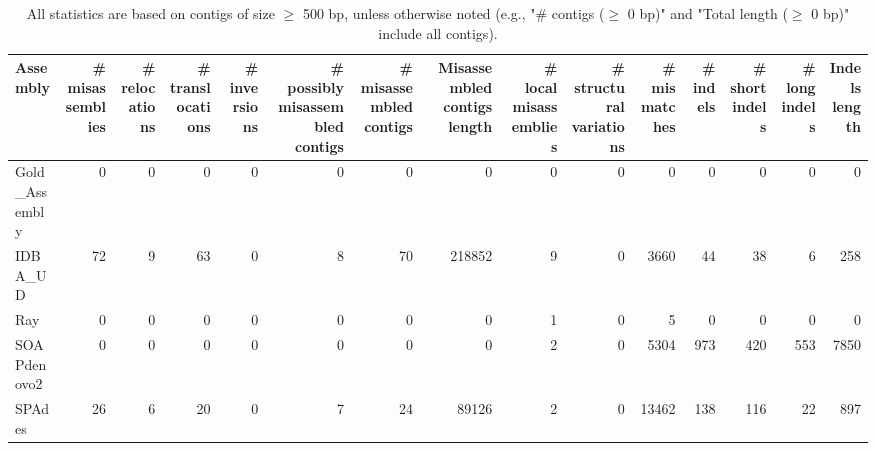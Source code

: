 \documentclass[12pt,a4paper]{article}
\begin{document}
\begin{table}[ht]
\begin{center}
\caption{All statistics are based on contigs of size $\geq$ 500 bp, unless otherwise noted (e.g., "\# contigs ($\geq$ 0 bp)" and "Total length ($\geq$ 0 bp)" include all contigs).}
\begin{tabular}{|l*{14}{|r}|}
\hline
Assembly & \# misassemblies &     \# relocations &     \# translocations &     \# inversions & \# possibly misassembled contigs & \# misassembled contigs & Misassembled contigs length & \# local misassemblies & \# structural variations & \# mismatches & \# indels &     \# short indels &     \# long indels & Indels length \\ \hline
Gold\_Assembly & 0 & 0 & 0 & 0 & 0 & 0 & 0 & 0 & 0 & 0 & 0 & 0 & 0 & 0 \\ \hline
IDBA\_UD & 72 & 9 & 63 & 0 & 8 & 70 & 218852 & 9 & 0 & 3660 & 44 & 38 & 6 & 258 \\ \hline
Ray & 0 & 0 & 0 & 0 & 0 & 0 & 0 & 1 & 0 & 5 & 0 & 0 & 0 & 0 \\ \hline
SOAPdenovo2 & 0 & 0 & 0 & 0 & 0 & 0 & 0 & 2 & 0 & 5304 & 973 & 420 & 553 & 7850 \\ \hline
SPAdes & 26 & 6 & 20 & 0 & 7 & 24 & 89126 & 2 & 0 & 13462 & 138 & 116 & 22 & 897 \\ \hline
\end{tabular}
\end{center}
\end{table}
\end{document}
